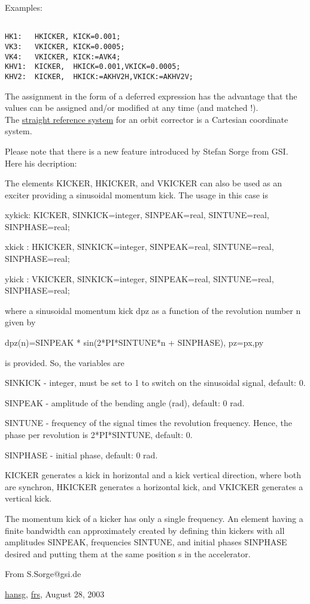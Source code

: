  Examples: 
\begin{verbatim}

HK1:   HKICKER, KICK=0.001;
VK3:   VKICKER, KICK=0.0005;
VK4:   VKICKER, KICK:=AVK4;
KHV1:  KICKER,  HKICK=0.001,VKICK=0.0005;
KHV2:  KICKER,  HKICK:=AKHV2H,VKICK:=AKHV2V;
\end{verbatim} The assignment in the form of a deferred expression has the advantage that the values can be assigned and/or modified at any time (and matched !). 
\\ The \href{local_system.html#straight}{straight reference system} for an orbit corrector is a Cartesian coordinate system.  

 Please note that there is a new feature introduced by Stefan Sorge from GSI. Here his decription:

The elements KICKER, HKICKER, and VKICKER can also be used as  an exciter providing a sinusoidal momentum kick. The usage in this case is  



xykick: KICKER, SINKICK=integer, SINPEAK=real, SINTUNE=real, SINPHASE=real;  

xkick : HKICKER, SINKICK=integer, SINPEAK=real, SINTUNE=real, SINPHASE=real;  

ykick : VKICKER, SINKICK=integer, SINPEAK=real, SINTUNE=real, SINPHASE=real;  

 where a sinusoidal momentum kick dpz as a function of the  revolution number n given by  

 dpz(n)=SINPEAK * sin(2*PI*SINTUNE*n + SINPHASE), pz=px,py  

 is provided. So, the variables are 



SINKICK - integer, must be set to 1 to switch on the sinusoidal signal,        default: 0.  

SINPEAK - amplitude of the bending angle (rad), default: 0 rad.  

SINTUNE - frequency of the signal times the revolution frequency.        Hence, the phase per revolution is 2*PI*SINTUNE, default: 0.  

SINPHASE - initial phase, default: 0 rad.  

 KICKER generates a kick in horizontal and a kick vertical direction,  where both are synchron, HKICKER generates a horizontal kick,  and VKICKER generates a vertical kick.  

 The momentum kick of a kicker has only a single frequency. An element  having a finite bandwidth can approximately created by defining  thin kickers with all amplitudes SINPEAK, frequencies SINTUNE, and  initial phases SINPHASE desired and putting them at the same position s in  the accelerator.  

 From S.Sorge@gsi.de  

\href{http://www.cern.ch/Hans.Grote/hansg_sign.html}{hansg}, \href{http://www.cern.ch/Frank.Schmidt/frs_sign.html}{frs}, August 28, 2003  

